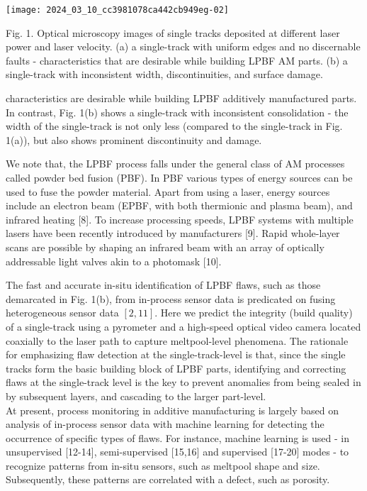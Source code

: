 \documentclass[10pt]{article}
\begin{document}
\begin{center}
\texttt{[image: 2024\_03\_10\_cc3981078ca442cb949eg-02]}
\end{center}

Fig. 1. Optical microscopy images of single tracks deposited at different laser power and laser velocity. (a) a single-track with uniform edges and no discernable faults - characteristics that are desirable while building LPBF AM parts. (b) a single-track with inconsistent width, discontinuities, and surface damage.

characteristics are desirable while building LPBF additively manufactured parts. In contrast, Fig. 1(b) shows a single-track with inconsistent consolidation - the width of the single-track is not only less (compared to the single-track in Fig. 1(a)), but also shows prominent discontinuity and damage.

We note that, the LPBF process falls under the general class of AM processes called powder bed fusion (PBF). In PBF various types of energy sources can be used to fuse the powder material. Apart from using a laser, energy sources include an electron beam (EPBF, with both thermionic and plasma beam), and infrared heating [8]. To increase processing speeds, LPBF systems with multiple lasers have been recently introduced by manufacturers [9]. Rapid whole-layer scans are possible by shaping an infrared beam with an array of optically addressable light valves akin to a photomask [10].

The fast and accurate in-situ identification of LPBF flaws, such as those demarcated in Fig. 1(b), from in-process sensor data is predicated on fusing heterogeneous sensor data $[2,11]$. Here we predict the integrity (build quality) of a single-track using a pyrometer and a high-speed optical video camera located coaxially to the laser path to capture meltpool-level phenomena. The rationale for emphasizing flaw detection at the single-track-level is that, since the single tracks form the basic building block of LPBF parts, identifying and correcting flaws at the single-track level is the key to prevent anomalies from being sealed in by subsequent layers, and cascading to the larger part-level.\\
At present, process monitoring in additive manufacturing is largely based on analysis of in-process sensor data with machine learning for detecting the occurrence of specific types of flaws. For instance, machine learning is used - in unsupervised [12-14], semi-supervised [15,16] and supervised [17-20] modes - to recognize patterns from in-situ sensors, such as meltpool shape and size. Subsequently, these patterns are correlated with a defect, such as porosity.
\end{document}

